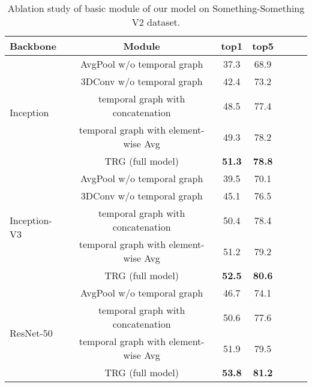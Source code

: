 \documentclass[conference,compsoc]{IEEEtran}
\begin{document}
    
\begin{table}
\caption{Ablation study of basic module of our model on Something-Something V2 dataset.}
        \begin{center}
        \begin{tabular}{lcccccc}
        \toprule
         Backbone & Module & top1 & top5\\
         \midrule
         \multirow{5}{*}{Inception} &  AvgPool w/o temporal graph & 37.3 & 68.9\\
         &3DConv w/o temporal graph & 42.4 & 73.2\\
         & temporal graph with concatenation & 48.5 & 77.4\\
         & temporal graph with element-wise Avg & 49.3 & 78.2 \\
         & TRG (full model) & \textbf{51.3} & \textbf{78.8} \\ \hline
         \multirow{5}{*}{Inception-V3} &  AvgPool w/o temporal graph & 39.5 & 70.1\\
         &3DConv w/o temporal graph & 45.1 & 76.5 \\
         & temporal graph with concatenation & 50.4 & 78.4\\
         & temporal graph with element-wise Avg & 51.2 & 79.2\\
         & TRG (full model) & \textbf{52.5} & \textbf{80.6}\\ \hline
         \multirow{4}{*}{ResNet-50} &  AvgPool w/o temporal graph & 46.7 & 74.1\\
& temporal graph with concatenation & 50.6 & 77.6\\
         & temporal graph with element-wise Avg & 51.9 & 79.5\\
         & TRG (full model) & \textbf{53.8} & \textbf{81.2}\\
         \bottomrule
        \end{tabular}
        \end{center}
        \vspace{-3mm}
        \label{tab:abla-module}
\end{table}
    
\end{document}
